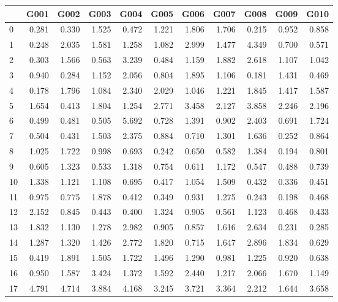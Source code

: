 \begin{tabular}{lrrrrrrrrrr}
\toprule
{} &   G001 &   G002 &   G003 &   G004 &   G005 &   G006 &   G007 &   G008 &   G009 &   G010 \\
\midrule
0   &  0.281 &  0.330 &  1.525 &  0.472 &  1.221 &  1.806 &  1.706 &  0.215 &  0.952 &  0.858 \\
1   &  0.248 &  2.035 &  1.581 &  1.258 &  1.082 &  2.999 &  1.477 &  4.349 &  0.700 &  0.571 \\
2   &  0.303 &  1.566 &  0.563 &  3.239 &  0.484 &  1.159 &  1.882 &  2.618 &  1.107 &  1.042 \\
3   &  0.940 &  0.284 &  1.152 &  2.056 &  0.804 &  1.895 &  1.106 &  0.181 &  1.431 &  0.469 \\
4   &  0.178 &  1.796 &  1.084 &  2.340 &  2.029 &  1.046 &  1.221 &  1.845 &  1.417 &  1.587 \\
5   &  1.654 &  0.413 &  1.804 &  1.254 &  2.771 &  3.458 &  2.127 &  3.858 &  2.246 &  2.196 \\
6   &  0.499 &  0.481 &  0.505 &  5.692 &  0.728 &  1.391 &  0.902 &  2.403 &  0.691 &  1.724 \\
7   &  0.504 &  0.431 &  1.503 &  2.375 &  0.884 &  0.710 &  1.301 &  1.636 &  0.252 &  0.864 \\
8   &  1.025 &  1.722 &  0.998 &  0.693 &  0.242 &  0.650 &  0.582 &  1.384 &  0.194 &  0.801 \\
9   &  0.605 &  1.323 &  0.533 &  1.318 &  0.754 &  0.611 &  1.172 &  0.547 &  0.488 &  0.739 \\
10  &  1.338 &  1.121 &  1.108 &  0.695 &  0.417 &  1.054 &  1.509 &  0.432 &  0.336 &  0.451 \\
11  &  0.975 &  0.775 &  1.878 &  0.412 &  0.349 &  0.931 &  1.275 &  0.243 &  0.198 &  0.468 \\
12  &  2.152 &  0.845 &  0.443 &  0.400 &  1.324 &  0.905 &  0.561 &  1.123 &  0.468 &  0.433 \\
13  &  1.832 &  1.130 &  1.278 &  2.982 &  0.905 &  0.857 &  1.616 &  2.634 &  0.231 &  0.285 \\
14  &  1.287 &  1.320 &  1.426 &  2.772 &  1.820 &  0.715 &  1.647 &  2.896 &  1.834 &  0.629 \\
15  &  0.419 &  1.891 &  1.505 &  1.722 &  1.496 &  1.290 &  0.981 &  1.225 &  0.920 &  0.638 \\
16  &  0.950 &  1.587 &  3.424 &  1.372 &  1.592 &  2.440 &  1.217 &  2.066 &  1.670 &  1.149 \\
17  &  4.791 &  4.714 &  3.884 &  4.168 &  3.245 &  3.721 &  3.364 &  2.212 &  1.644 &  3.658 \\

\end{tabular}
